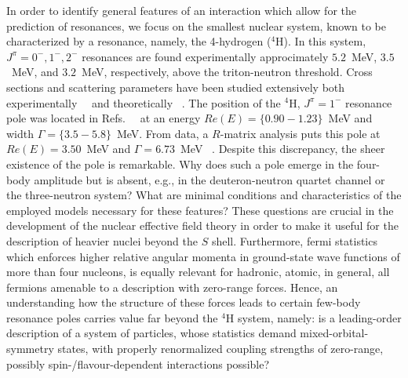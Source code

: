 \documentclass[aps,onecolumn,preprintnumbers,amsmath,amssymb,nofootinbib,superscriptaddress,notitlepage]{revtex4-1}
\begin{document}
%
In order to identify general features of an interaction which allow for the
prediction of resonances, we focus on the smallest nuclear system, known to
be characterized by a resonance, namely, the 4-hydrogen ($^4$H).
In this system, $J^\pi=0^-, 1^-, 2^-$ resonances are found experimentally approcimately
$5.2$~MeV, $3.5$~MeV, and $3.2$~MeV, respectively, above the triton-neutron threshold.
Cross sections and scattering parameters have been studied extensively both experimentally
~\cite{osti_4230875, Phillips:1980zz, Tilley:1992zz}~and theoretically~
\cite{Ciesielski:1997vy,Ciesielski:1998sy,Ciesielski:1999pp,Viviani:1998gr,Fonseca:1999zz,Lazauskas:2004uq}.
The position of the $^4$H, $J^\pi=1^-$ resonance pole was located in
Refs.~\cite{Arai:2003ek,deDiego:2007rd,Lazauskas:2019cxj}~ at an energy
$Re(E)=\{0.90 - 1.23\}$~MeV and width $\Gamma=\{3.5 - 5.8\}$~MeV.
From data, a $R$-matrix analysis puts this pole at $Re(E)=3.50$~MeV and $\Gamma=6.73$~MeV~
\cite{Tilley:1992zz}.
Despite this discrepancy, the sheer existence of the pole is remarkable.
%
%
%
Why does
such a pole emerge in the four-body amplitude but is absent, e.g., in the
deuteron-neutron quartet channel or the three-neutron system? What are minimal
conditions and characteristics of the employed models necessary for these features?
These questions are crucial in the development of the nuclear effective field
theory in order to make it useful for the description of heavier nuclei beyond
the $S$ shell.
Furthermore, fermi statistics which enforces higher relative angular
momenta in ground-state wave functions of more than four nucleons, is equally
relevant for hadronic, atomic, in general, all fermions amenable
to a description with zero-range forces. Hence, an understanding how the structure
of these forces leads to certain few-body resonance poles carries value far beyond the
$^4$H system, namely: is a leading-order description of a system of particles, whose
statistics demand mixed-orbital-symmetry states, with properly renormalized coupling
strengths of zero-range, possibly spin-/flavour-dependent interactions possible?
%
%
%
%
\end{document}
